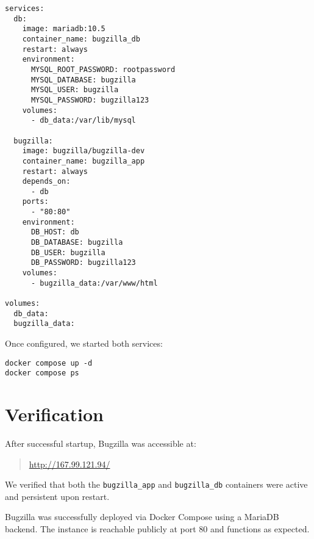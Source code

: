 \begin{verbatim}
services:
  db:
    image: mariadb:10.5
    container_name: bugzilla_db
    restart: always
    environment:
      MYSQL_ROOT_PASSWORD: rootpassword
      MYSQL_DATABASE: bugzilla
      MYSQL_USER: bugzilla
      MYSQL_PASSWORD: bugzilla123
    volumes:
      - db_data:/var/lib/mysql

  bugzilla:
    image: bugzilla/bugzilla-dev
    container_name: bugzilla_app
    restart: always
    depends_on:
      - db
    ports:
      - "80:80"
    environment:
      DB_HOST: db
      DB_DATABASE: bugzilla
      DB_USER: bugzilla
      DB_PASSWORD: bugzilla123
    volumes:
      - bugzilla_data:/var/www/html

volumes:
  db_data:
  bugzilla_data:
\end{verbatim}

Once configured, we started both services:
\begin{verbatim}
docker compose up -d
docker compose ps
\end{verbatim}

\section{Verification}

After successful startup, Bugzilla was accessible at:
\begin{quote}
\url{http://167.99.121.94/}
\end{quote}

We verified that both the \texttt{bugzilla\_app} and \texttt{bugzilla\_db} containers were active and persistent upon restart.

Bugzilla was successfully deployed via Docker Compose using a MariaDB backend.  
The instance is reachable publicly at port 80 and functions as expected.